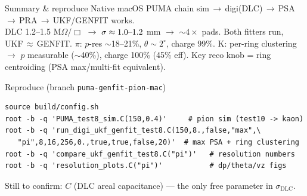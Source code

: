 \documentclass[aspectratio=169,10pt]{beamer}
\begin{document}
\begin{frame}[fragile]{Summary \& reproduce}
Native macOS PUMA chain sim\,$\to$\,digi(DLC)\,$\to$\,PSA\,$\to$\,PRA\,$\to$\,UKF/GENFIT works.\\
DLC 1.2--1.5 M\(\Omega/\Box\) $\to$ \(\sigma\approx1.0$--$1.2\) mm $\to$ $\sim4\times$ pads. Both fitters run, UKF\,$\approx$\,GENFIT.
\(\pi\): \(p\)-res $\sim$18--21\%, \(\theta\sim2^\circ\), charge 99\%. K: per-ring clustering $\to$ \(p\) measurable ($\sim$40\%), charge 100\% (45\% eff). Key reco knob = ring centroiding (PSA max/multi-fit equivalent).
\begin{block}{Reproduce (branch \texttt{puma-genfit-pion-mac})}
\scriptsize\begin{verbatim}
source build/config.sh
root -b -q 'PUMA_test8_sim.C(150,0.4)'     # pion sim (test10 -> kaon)
root -b -q 'run_digi_ukf_genfit_test8.C(150,8.,false,"max",\
   "pi",8,16,256,0.,true,true,false,20)'  # max PSA + ring clustering
root -b -q 'compare_ukf_genfit_test8.C("pi")'   # resolution numbers
root -b -q 'resolution_plots.C("pi")'           # dp/theta/vz figs
\end{verbatim}
\end{block}
\alert{Still to confirm:} \(C\) (DLC areal capacitance) --- the only free parameter in \(\sigma_{\mathrm{DLC}}\).
\end{frame}
\end{document}
